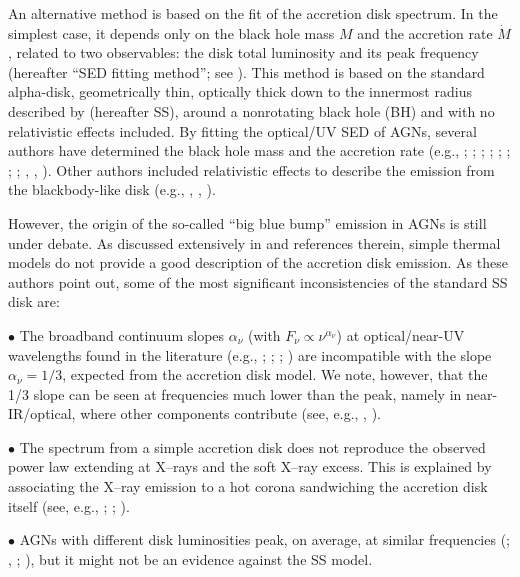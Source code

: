 \documentclass{aa}
\begin{document}
An alternative method is based on the fit of the accretion disk spectrum. In the simplest case, it depends only on the black hole mass $M$ and the accretion rate $\dot M$, related to two observables: the disk total luminosity and its peak frequency (hereafter ``SED fitting method''; see \citealt{Caldero}). This method is based on the standard alpha-disk, geometrically thin, optically thick down to the innermost radius described by \citealt{SS} (hereafter SS), around a nonrotating black hole (BH) and with no relativistic effects included. By fitting the optical/UV SED of AGNs, several authors have determined the black hole mass and the accretion rate (e.g., \citealt{Shields}; \citealt{MalkSarg}; \citealt{Malkan}; \citealt{SunMalk}; \citealt{Zhengetal}; \citealt{Trakhten}; \citealt{GhiTav09}; \citealt{Sbaretal13}; \citealt{Caldero}, \citealt{Capel1}, \citealt{Capel3}). Other authors included relativistic effects to describe the emission from the blackbody-like disk (e.g., \citealt{NovTho}, \citealt{PageTho}, \citealt{Riff}). 

However, the origin of the so-called ``big blue bump'' emission in AGNs is still under debate. As discussed extensively in \citet{Kora} and references therein, simple thermal models do not provide a good description of the accretion disk emission.
As these authors point out, some of the most significant inconsistencies of the standard SS disk are:

$\bullet$ The broadband continuum slopes $\alpha_{\nu}$ (with $F_{\nu} \propto \nu^{\alpha_{\nu}}$) at optical/near-UV wavelengths found in the literature (e.g., \citealt{Neugetal}; \citealt{Vandenetal}; \citealt{Bonningetal}; \citealt{DavWooBla}) are incompatible with the slope $\alpha_{\nu} = 1/3$, expected from the accretion disk model. We note, however, that the 1/3 slope can be seen at frequencies much lower than the peak, namely in near-IR/optical, where other components contribute (see, e.g., \citealt{Kishietal}, \citealt{Caldero}).

$\bullet$ The spectrum from a simple accretion disk does not reproduce the observed power law extending at X--rays and the soft X--ray excess. This is explained by associating the X--ray emission to a hot corona sandwiching the accretion disk itself (see, e.g., \citealt{Pounds}; \citealt{NanPou}; \citealt{FabianMiniu}).

$\bullet$ 
AGNs with different disk luminosities peak, on average, at similar frequencies (\citealt{Sandersetal}; \citealt{WaltFink}, \citealt{DavWooBla}; \citealt{LaoDav}), but it might not be an evidence against the SS model.
\end{document}
